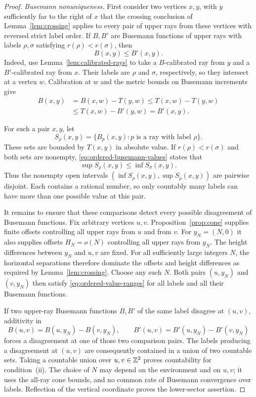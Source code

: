 \begin{proof}
\emph{Busemann nonuniqueness.}
First consider two vertices $x,y$, with $y$ sufficiently far to the
right of $x$ that the crossing conclusion of
Lemma~\ref{lem:crossing} applies to every pair of upper rays from
these vertices with reversed strict label order.  If $B,B'$ are
Busemann functions of upper rays with labels $\rho,\sigma$ satisfying
$r(\rho)<r(\sigma)$, then
\begin{equation}
 B(x,y)\le B'(x,y).
 \label{eq:ordered-busemann-values}
\end{equation}
Indeed, use Lemma~\ref{lem:calibrated-rays} to take a $B$-calibrated
ray from $y$ and a $B'$-calibrated ray from $x$.  Their labels are
$\rho$ and $\sigma$, respectively, so they intersect at a vertex
$w$.  Calibration at $w$ and the metric bounds on Busemann increments
give
\begin{align*}
 B(x,y)&=B(x,w)-T(y,w)\le T(x,w)-T(y,w)\\
       &\le T(x,w)-B'(y,w)=B'(x,y).
\end{align*}

For such a pair $x,y$, let
\[
 S_\rho(x,y)=\{B_p(x,y):p\text{ is a ray with label }\rho\}.
\]
These sets are bounded by $T(x,y)$ in absolute value.  If
$r(\rho)<r(\sigma)$ and both sets are nonempty,
\eqref{eq:ordered-busemann-values} states that
\begin{equation}
 \sup S_\rho(x,y)\le\inf S_\sigma(x,y).
 \label{eq:ordered-value-ranges}
\end{equation}
Thus the nonempty open intervals
$(\inf S_\rho(x,y),\sup S_\rho(x,y))$ are pairwise disjoint.  Each
contains a rational number, so only countably many labels can have
more than one possible value at this pair.

It remains to ensure that these comparisons detect every possible
disagreement of Busemann functions.  Fix arbitrary vertices $u,v$.
Proposition~\ref{prop:cone} supplies finite offsets controlling all
upper rays from $u$ and from $v$.  For $y_N=(N,0)$ it also supplies
offsets $H_N=o(N)$ controlling all upper rays from $y_N$.  The height
differences between $y_N$ and $u,v$ are fixed.  For all sufficiently
large integers $N$, the horizontal separations therefore dominate
the offsets and height differences as required by
Lemma~\ref{lem:crossing}.  Choose any such $N$.  Both pairs $(u,y_N)$
and $(v,y_N)$ then satisfy \eqref{eq:ordered-value-ranges} for all
labels and all their Busemann functions.

If two upper-ray Busemann functions $B,B'$ of the same label disagree
at $(u,v)$, additivity in
\[
 B(u,v)=B(u,y_N)-B(v,y_N),\qquad
 B'(u,v)=B'(u,y_N)-B'(v,y_N)
\]
forces a disagreement at one of those two comparison pairs.  The
labels producing a disagreement at $(u,v)$ are consequently contained
in a union of two countable sets.  Taking a countable union over
$u,v\in\mathbb Z^2$ proves countability for condition~(ii).  The choice of
$N$ may depend on the environment and on $u,v$; it uses the all-ray
cone bounds, and no common rate of Busemann convergence over labels.
Reflection of the vertical coordinate proves the lower-sector
assertion.
\end{proof}

